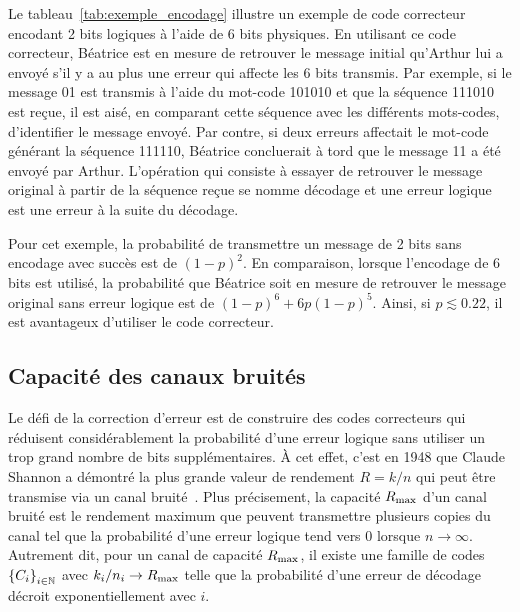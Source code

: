 Le tableau~\ref{tab:exemple_encodage} illustre un exemple de code correcteur
encodant 2 bits logiques à l'aide de 6 bits physiques.
En utilisant ce code correcteur,
Béatrice est en mesure de retrouver le message initial qu'Arthur lui a
envoyé s'il y a au plus une erreur qui affecte les 6 bits transmis. 
Par exemple, si le message 01 est transmis à l'aide du mot-code 
101010 et que la séquence 111010 est reçue, 
il est aisé, en comparant cette séquence avec les différents 
mots-codes, d'identifier le message envoyé. 
Par contre, 
si deux erreurs affectait le mot-code générant la séquence 111110, 
Béatrice concluerait à tord que le message 11 a été envoyé par Arthur.
L'opération qui consiste à essayer de retrouver le message original à partir
de la séquence reçue se nomme décodage 
et une erreur logique est une erreur à la suite du décodage.

Pour cet exemple,
la probabilité de transmettre un message de 2 bits sans encodage avec succès 
est de $(1 - p)^2$. 
En comparaison,
lorsque l'encodage de 6 bits est utilisé, 
la probabilité que Béatrice soit en mesure de retrouver le message original 
sans erreur logique est de $(1 - p)^6 + 6p(1 - p)^5$.
Ainsi, si $p \lesssim 0.22$, il est avantageux d'utiliser le code correcteur.

\subsection{Capacité des canaux bruités}

Le défi de la correction d'erreur est de construire des codes correcteurs 
qui réduisent considérablement la probabilité d'une erreur logique sans utiliser 
un trop grand nombre de bits supplémentaires.
À cet effet, c'est en 1948 que Claude Shannon a démontré la plus grande valeur 
de rendement $R = k/n$ qui peut être transmise 
via un canal bruité~\cite{shannon_mathematical_1948}.
Plus précisement,
la capacité $R_{\text{max}}$ d'un canal bruité est le rendement maximum 
que peuvent transmettre plusieurs copies du canal tel que la probabilité d'une 
erreur logique tend vers 0 lorsque $n \to \infty$.
Autrement dit,
pour un canal de capacité $R_{\text{max}}$, 
il existe une famille de codes $\qty{C_i}_{i\in\mathbb N}$ avec 
$k_i / n_i \to R_{\text{max}}$ telle que la probabilité d'une erreur de 
décodage décroit exponentiellement avec $i$.

